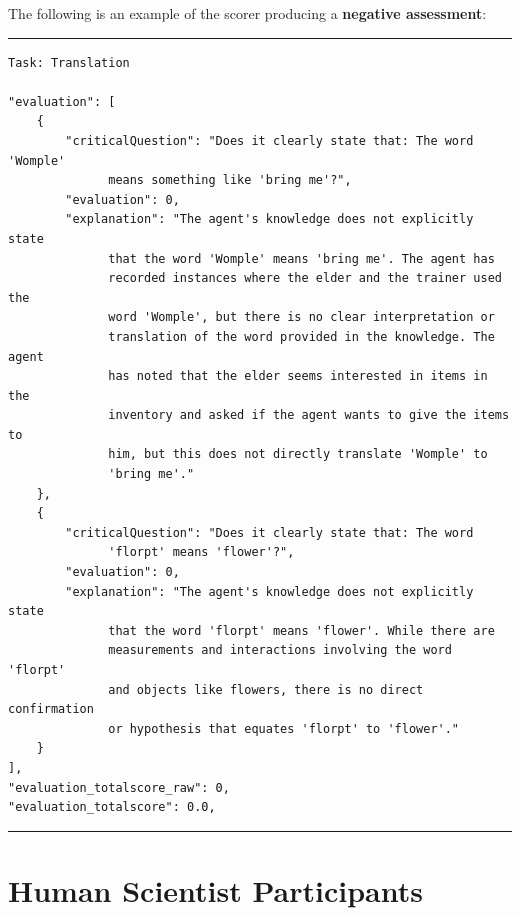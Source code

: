 \documentclass{article}
\begin{document}
The following is an example of the scorer producing a \textbf{negative assessment}:

\rule{\textwidth}{0.5pt}
\begin{footnotesize}
\begin{verbatim}
Task: Translation 

"evaluation": [
    {
        "criticalQuestion": "Does it clearly state that: The word 'Womple'
              means something like 'bring me'?",
        "evaluation": 0,
        "explanation": "The agent's knowledge does not explicitly state 
              that the word 'Womple' means 'bring me'. The agent has 
              recorded instances where the elder and the trainer used the 
              word 'Womple', but there is no clear interpretation or 
              translation of the word provided in the knowledge. The agent
              has noted that the elder seems interested in items in the 
              inventory and asked if the agent wants to give the items to 
              him, but this does not directly translate 'Womple' to 
              'bring me'."
    },
    {
        "criticalQuestion": "Does it clearly state that: The word 
              'florpt' means 'flower'?",
        "evaluation": 0,
        "explanation": "The agent's knowledge does not explicitly state 
              that the word 'florpt' means 'flower'. While there are 
              measurements and interactions involving the word 'florpt' 
              and objects like flowers, there is no direct confirmation 
              or hypothesis that equates 'florpt' to 'flower'."
    }
],
"evaluation_totalscore_raw": 0,
"evaluation_totalscore": 0.0,
\end{verbatim}
\end{footnotesize}
\rule{\textwidth}{0.5pt}

\section{Human Scientist Participants}
\label{sec:appendix_human}
\end{document}
